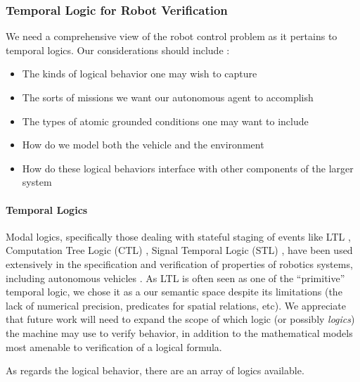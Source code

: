 \documentclass[a4paper, 11pt]{article}
\begin{document}
\subsubsection{Temporal Logic for Robot Verification}


We need a comprehensive view of the robot control problem as it pertains to
temporal logics. Our considerations should include :

\begin{itemize}
\item The kinds of logical behavior one may wish to capture
\item The sorts of missions we want our autonomous agent to accomplish
\item The types of atomic grounded conditions one may want to include
\item How do we model both the vehicle and the environment
\item How do these logical behaviors interface with other components of the
  larger system
\end{itemize}

\paragraph{Temporal Logics}



Modal logics, specifically those dealing with stateful staging of events like
LTL \cite{ltl95}, Computation Tree Logic (CTL) \cite{yooCTL}, Signal Temporal
Logic (STL) \cite{stlAut} , have been used extensively in the specification and
verification of properties of robotics systems, including autonomous vehicles .
As LTL is often seen as one of the ``primitive'' temporal logic, we chose it as
a our semantic space despite its limitations (the lack of numerical precision,
predicates for spatial relations, etc). We appreciate that future work will need
to expand the scope of which logic (or possibly \emph{logics}) the machine may
use to verify behavior, in addition to the mathematical models most amenable to
verification of a logical formula.

As regards the logical behavior, there are an array of logics available.
\end{document}
